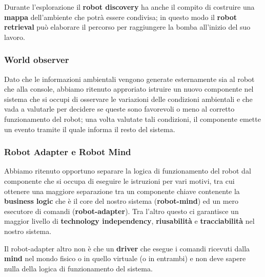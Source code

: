 Durante l'esplorazione il \textbf{robot discovery} ha anche il compito di costruire una \textbf{mappa} dell'ambiente che potrà essere condivisa;
in questo modo il \textbf{robot retrieval} può elaborare il percorso per raggiungere la bomba all'inizio del suo lavoro.

\subsubsection{World observer}

Dato che le informazioni ambientali vengono generate esternamente sia al robot che alla console,
abbiamo ritenuto approriato istruire un nuovo componente nel sistema che si occupi di osservare le variazioni delle condizioni ambientali
e che vada a valutarle per decidere se queste sono favorevoli o meno al corretto funzionamento del robot;
una volta valutate tali condizioni, il componente emette un evento tramite il quale informa il resto del sistema.

\subsubsection{Robot Adapter e Robot Mind}

Abbiamo ritenuto opportuno separare la logica di funzionamento del robot dal componente che si occupa di eseguire le istruzioni per vari motivi,
tra cui ottenere una maggiore separazione tra un componente chiave contenente la \textbf{business logic} che è il core del nostro sistema (\textbf{robot-mind}) ed un mero esecutore di comandi (\textbf{robot-adapter}).
Tra l'altro questo ci garantisce un maggior livello di \textbf{technology independency}, \textbf{riusabilità} e \textbf{tracciabilità} nel nostro sistema.

Il robot-adapter altro non è che un \textbf{driver} che esegue i comandi ricevuti dalla \textbf{mind} nel mondo fisico o in quello virtuale (o in entrambi) e non deve sapere nulla della logica di funzionamento del sistema.

